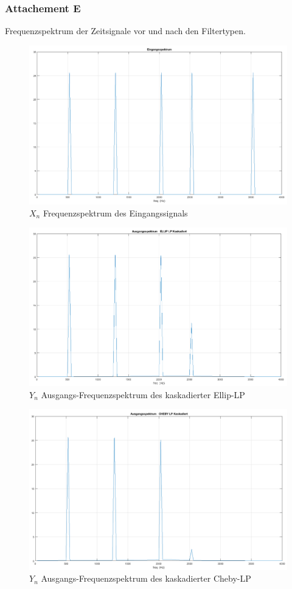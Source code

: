\subsubsection{Attachement E}
Frequenzspektrum der Zeitsignale vor und nach den Filtertypen.
\begin{figure}[h]
\centering
\includegraphics[width=0.7\linewidth]{Bilder/Attachment_E_Eingangsspektrum}
\caption{$X_{n}$ Frequenzspektrum des Eingangssignals}
\label{fig:Attachment_E_Eingangsspektrum}
\end{figure}

\begin{figure}[h]
\centering
\includegraphics[width=0.7\linewidth]{Bilder/Attachment_E_ELLIP_LP_Spektrum}
\caption{$Y_{n}$ Ausgangs-Frequenzspektrum des kaskadierter Ellip-LP}
\label{fig:Attachment_E_ELLIP_LP_Spektrum}
\end{figure}

\newpage

\begin{figure}[h]
\centering
\includegraphics[width=0.7\linewidth]{Bilder/Attachment_E_CHEBY_LP_Spektrum}
\caption{$Y_{n}$ Ausgangs-Frequenzspektrum des kaskadierter Cheby-LP}
\label{fig:Attachment_E_CHEBY_LP_Spektrum}
\end{figure}

